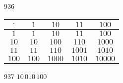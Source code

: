 \begin{Vastaus}{936}
\begin{tabular}{|c||c|c|c|c|}
	\hline
	$\cdot$ & $1$ & $10$ & $11$ & $100$ \\
	\hline
	\hline
	$1$ & $1$ & $10$ & $11$ & $100$ \\
	\hline
	$10$ & $10$ & $100$ & $110$ & $1000$  \\
	\hline
	$11$ & $11$ & $110$ & $1001$ & $1010$ \\
	\hline
	$100$ & $100$ & $1000$ & $1010$ & $10000$ \\
	\hline
	\end{tabular}
	
\end{Vastaus}
\begin{Vastaus}{937}
		$10\,010\,100$
	
\end{Vastaus}
